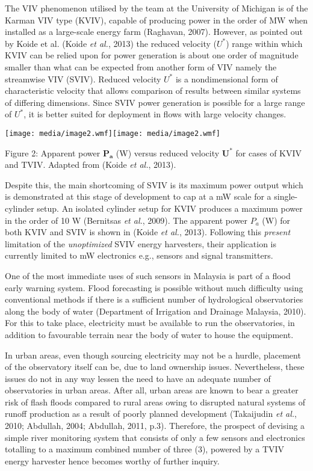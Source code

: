\documentclass[]{article}
\begin{document}
The VIV phenomenon utilised by the team at the University of Michigan is
of the Karman VIV type (KVIV), capable of producing power in the order
of MW when installed as a large-scale energy farm (Raghavan, 2007).
However, as pointed out by Koide et al. (Koide \emph{et al.}, 2013) the
reduced velocity (\(U^{*}\)) range within which KVIV can be relied upon
for power generation is about one order of magnitude smaller than what
can be expected from another form of VIV namely the streamwise VIV
(SVIV). Reduced velocity \(U^{*}\) is a nondimensional form of
characteristic velocity that allows comparison of results between
similar systems of differing dimensions. Since SVIV power generation is
possible for a large range of \(U^{*}\), it is better suited for
deployment in flows with large velocity changes.

\protect\hypertarget{_Toc520544809}{}{}\texttt{[image: media/image2.wmf]}\texttt{[image: media/image2.wmf]}

\protect\hypertarget{_Toc520544686}{}{\protect\hypertarget{_Toc41048825}{}{}}Figure
2: Apparent power \(\mathbf{P}_{\mathbf{a}}\) (W) versus reduced
velocity \(\mathbf{U}^{*}\) for cases of KVIV and TVIV. Adapted from
(Koide \emph{et al.}, 2013).

Despite this, the main shortcoming of SVIV is its maximum power output
which is demonstrated at this stage of development to cap at a mW scale
for a single-cylinder setup. An isolated cylinder setup for KVIV
produces a maximum power in the order of 10 W (Bernitsas \emph{et al.},
2009). The apparent power \(P_{a}\) (W) for both KVIV and SVIV is shown
in (Koide \emph{et al.}, 2013). Following this \emph{present} limitation
of the \emph{unoptimized} SVIV energy harvesters, their application is
currently limited to mW electronics e.g., sensors and signal
transmitters.

One of the most immediate uses of such sensors in Malaysia is part of a
flood early warning system. Flood forecasting is possible without much
difficulty using conventional methods if there is a sufficient number of
hydrological observatories along the body of water (Department of
Irrigation and Drainage Malaysia, 2010). For this to take place,
electricity must be available to run the observatories, in addition to
favourable terrain near the body of water to house the equipment.

In urban areas, even though sourcing electricity may not be a hurdle,
placement of the observatory itself can be, due to land ownership
issues. Nevertheless, these issues do not in any way lessen the need to
have an adequate number of observatories in urban areas. After all,
urban areas are known to bear a greater risk of flash floods compared to
rural areas owing to disrupted natural systems of runoff production as a
result of poorly planned development (Takaijudin \emph{et al.}, 2010;
Abdullah, 2004; Abdullah, 2011, p.3). Therefore, the prospect of
devising a simple river monitoring system that consists of only a few
sensors and electronics totalling to a maximum combined number of three
(3), powered by a TVIV energy harvester hence becomes worthy of further
inquiry.
\end{document}
